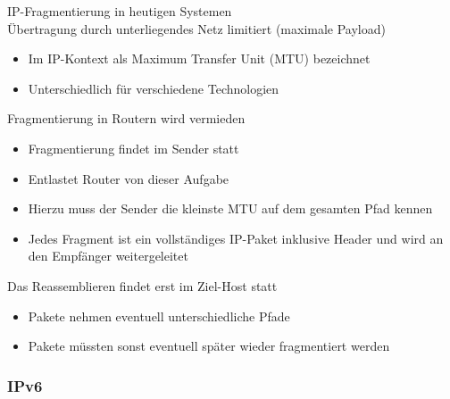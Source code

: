 \begin{concept}{IP-Fragmentierung in heutigen Systemen}\\
    Übertragung durch unterliegendes Netz limitiert (maximale Payload)
    \begin{itemize}
        \item Im IP-Kontext als Maximum Transfer Unit (MTU) bezeichnet
        \item Unterschiedlich für verschiedene Technologien
    \end{itemize}
    Fragmentierung in Routern wird vermieden
    \begin{itemize}
        \item Fragmentierung findet im Sender statt
        \item Entlastet Router von dieser Aufgabe
        \item Hierzu muss der Sender die kleinste MTU auf dem gesamten Pfad kennen
        \item Jedes Fragment ist ein vollständiges IP-Paket inklusive Header und wird an den Empfänger weitergeleitet
    \end{itemize}
    Das Reassemblieren findet erst im Ziel-Host statt
    \begin{itemize}
        \item Pakete nehmen eventuell unterschiedliche Pfade
        \item Pakete müssten sonst eventuell später wieder fragmentiert werden
    \end{itemize}
\end{concept}

\subsubsection{IPv6}

